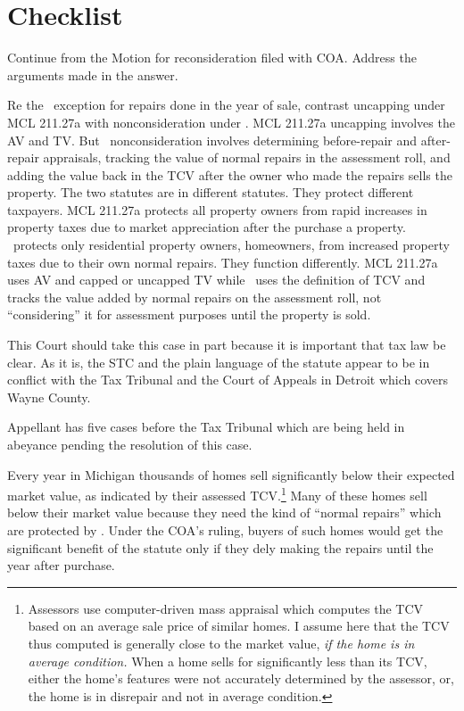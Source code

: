 \documentclass[12pt,\documentclassflag]{michiganCourtOfAppealsBrief}
\begin{document}
\section{Checklist}
\begin{todolist}
\item Continue from the Motion for reconsideration filed with COA. Address the arguments made in the answer.

  Re the \mathieuGast\ exception for repairs done in the year of sale, contrast uncapping under MCL 211.27a with nonconsideration under \mathieuGast. MCL 211.27a uncapping involves the AV and TV. But \mathieuGast\ nonconsideration involves determining before-repair and after-repair appraisals, tracking the value of normal repairs in the assessment roll, and adding the value back in the TCV after the owner who made the repairs sells the property.
  The two statutes are in different statutes. They protect different taxpayers. MCL 211.27a protects all property owners from rapid increases in property taxes due to market appreciation after the purchase a property. \mathieuGast\ protects only residential property owners, homeowners, from increased property taxes due to their own normal repairs. They function differently. MCL 211.27a uses AV and capped or uncapped TV while \mathieuGast\ uses the definition of TCV and tracks the value added by normal repairs on the assessment roll, not ``considering'' it for assessment purposes until the property is sold.

  

  This Court should take this case in part because it is important that tax law be clear. As it is, the STC and the plain language of the statute appear to be in conflict with the Tax Tribunal and the Court of Appeals in Detroit which covers Wayne County.

  Appellant has five cases before the Tax Tribunal which are being held in abeyance pending the resolution of this case.

  Every year in Michigan thousands of homes sell significantly below their expected market value, as indicated by their assessed TCV.\footnote{Assessors use computer-driven mass appraisal which computes the TCV based on an average sale price of similar homes. I assume here that the TCV thus computed is generally close to the market value, \emph{if the home is in average condition.}  When a home sells for significantly less than its TCV, either the home's features were not accurately determined by the assessor, or, the home is in disrepair and not in average condition.} Many of these homes sell below their market value because they need the kind of ``normal repairs'' which are protected by \mathieuGast. Under the COA's ruling, buyers of such homes would get the significant benefit of the statute only if they dely making the repairs until the year after purchase. 


\end{todolist}
\end{document}
